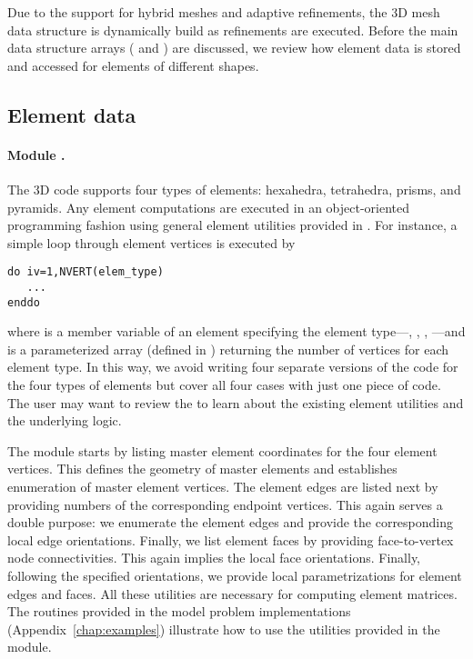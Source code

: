 Due to the support for hybrid meshes and adaptive refinements, the \hp3D mesh data structure is dynamically build as refinements are executed. Before the main data structure arrays ( and ) are discussed, we review how element data is stored and accessed for elements of different shapes.

\subsection{Element data}
\label{sec:element-data}

\paragraph{Module .}
The \hp3D code supports four types of elements: hexahedra, tetrahedra, prisms, and pyramids. Any element computations are executed in an object-oriented programming fashion using general element utilities provided in . For instance, a simple loop through element vertices is executed by

\begin{lstlisting}[caption=Loop over element vertices., label={lst:loop_element_vertices}]
do iv=1,NVERT(elem_type)
   ...
enddo
\end{lstlisting}

\noindent where  is a member variable of an element specifying the element type---, , , ---and  is a parameterized array (defined in  ) returning the number of vertices for each element type. In this way, we avoid writing four separate versions of the code for the four types of elements but cover all four cases with just one piece of code. The user may want to review the   to learn about the existing element utilities and the underlying logic.

The  module starts by listing master element coordinates for the four element vertices. This defines the geometry of master elements and establishes enumeration of master element vertices. The element edges are listed next by providing numbers of the corresponding endpoint vertices. This again serves a double purpose: we enumerate the element edges and provide the corresponding local edge orientations. Finally, we list element faces by providing face-to-vertex node connectivities. This again implies the local face orientations. Finally, following the specified orientations, we provide local parametrizations for element edges and faces. All these utilities are necessary for computing element matrices. The  routines provided in the model problem implementations (Appendix~\ref{chap:examples}) illustrate how to use the utilities provided in the module.

